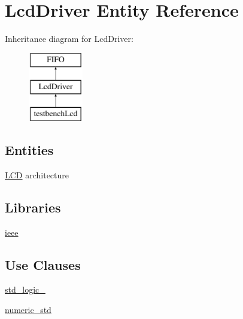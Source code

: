 \hypertarget{classLcdDriver}{}\section{Lcd\+Driver Entity Reference}
\label{classLcdDriver}
Inheritance diagram for Lcd\+Driver\+:\begin{figure}[H]
\begin{center}
\leavevmode
\includegraphics[height=3.000000cm]{classLcdDriver}
\end{center}
\end{figure}
\subsection*{Entities}
\begin{DoxyCompactItemize}
\item 
\hyperlink{classLcdDriver_1_1LCD}{L\+CD} architecture
\end{DoxyCompactItemize}
\subsection*{Libraries}
 \begin{DoxyCompactItemize}
\item 
\mbox{\label{classLcdDriver_a0a6af6eef40212dbaf130d57ce711256}} 
\hyperlink{classLcdDriver_a0a6af6eef40212dbaf130d57ce711256}{ieee} 
\end{DoxyCompactItemize}
\subsection*{Use Clauses}
 \begin{DoxyCompactItemize}
\item 
\mbox{\label{classLcdDriver_acd03516902501cd1c7296a98e22c6fcb}} 
\hyperlink{classLcdDriver_acd03516902501cd1c7296a98e22c6fcb}{std\+\_\+logic\+\_}   
\item 
\mbox{\label{classLcdDriver_a2edc34402b573437d5f25fa90ba4013e}} 
\hyperlink{classLcdDriver_a2edc34402b573437d5f25fa90ba4013e}{numeric\+\_\+std}   
\end{DoxyCompactItemize}
